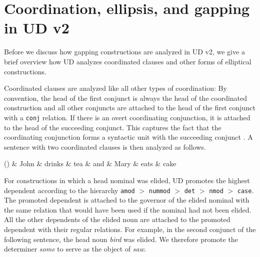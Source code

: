 \documentclass[11pt]{article}
\newenvironment{myquote}%
  {\list{}{\leftmargin=0.0in\rightmargin=0.0in}\item[]}%
  {\endlist}
\newcounter{excounter}
\begin{document}
\section{Coordination, ellipsis, and gapping in UD v2}

Before we discuss how gapping constructions are analyzed in UD v2, 
we give a brief overview how UD analyzes coordinated clauses and 
other forms of elliptical constructions.

Coordinated clauses are analyzed like all other types of coordination:
By convention, the head of the first conjunct is always the head of the 
coordinated construction and all other conjuncts are attached to the head 
of the first conjunct with a \texttt{conj} relation. If there is an overt 
coordinating conjunction, it is attached to the head of the succeeding 
conjunct. This captures the fact that the coordinating 
conjunction forms a syntactic unit with the succeeding conjunct 
\cite{Gerdes2015}. A sentence with two coordinated clauses is then 
analyzed as follows.

\begin{myquote}
  \label{ex:coord}
  \footnotesize
  \begin{dependency}
    \begin{deptext}[column sep=0.2cm]
      (\theexcounter) \& John \& drinks \& tea \& and \& Mary \& eats \& cake \\
    \end{deptext}
  \end{dependency}
\end{myquote}

For constructions in which a head nominal was elided, UD promotes the highest
 dependent according to the hierarchy \texttt{amod} $>$ \texttt{nummod} $>$ \texttt{det} 
 $>$ \texttt{nmod} $>$ \texttt{case}. The promoted dependent is attached to the governor 
 of the elided nominal with the same relation that would have been used if the nominal 
 had not been elided. All the other dependents of the elided noun are attached to the 
 promoted dependent with their regular relations. For example, in the second conjunct 
 of the following sentence, the head noun \textit{bird} was elided. We therefore promote 
 the determiner \textit{some} to serve as the object of \textit{saw}.
\end{document}
